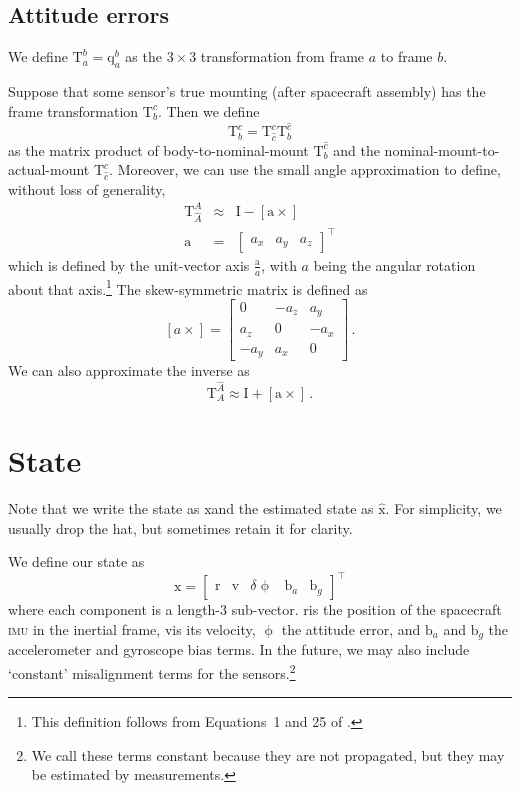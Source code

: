 \documentclass[12pt]{article}
\newcommand{\Tf}[2]{\ensuremath{\mathrm{T}_{#1}^{#2}}}
\newcommand{\skewsymm}[1]{\ensuremath{\left[ #1 \times \right]}}
\newcommand{\eye}{\ensuremath{\mathrm{I}}}
\newcommand{\Qf}[2]{\ensuremath{\mathrm{q}_{#1}^{#2}}}
\newcommand{\vecx}{\ensuremath{\mathrm{x}}}
\newcommand{\vecxh}{\ensuremath{\hat{\mathrm{x}}}}
\newcommand{\vecb}{\ensuremath{\mathrm{b}}}
\newcommand{\vecr}{\ensuremath{\mathrm{r}}}
\newcommand{\vecv}{\ensuremath{\mathrm{v}}}
\begin{document}
\subsection{Attitude errors}
We define $\Tf{a}{b} = \Qf{a}{b}$ as the $3\times 3$ transformation from frame $a$ to frame $b$.

Suppose that some sensor's true mounting (after spacecraft assembly) has the frame transformation \Tf{b}{c}. Then we define
\begin{equation}
\Tf{b}{c} = \Tf{\hat{c}}{c} \Tf{b}{\hat{c}}
\end{equation}
as the matrix product of body-to-nominal-mount \Tf{b}{\hat{c}} and the nominal-mount-to-actual-mount \Tf{\hat{c}}{c}. Moreover, we can use the small angle approximation to define, without loss of generality,
\begin{eqnarray}
\Tf{\hat{A}}{A} &\approx& \eye - \skewsymm{\mathrm{a}} \\
\mathrm{a} &=& \begin{bmatrix} a_x & a_y & a_z\end{bmatrix}^\top
\end{eqnarray}
which is defined by the unit-vector axis $\frac{\mathrm{a}}{a}$, with $a$ being the angular rotation about that axis.\footnote{This definition follows from Equations~1 and 25 of \citet{Markley2003}.} The skew-symmetric matrix is defined as
\begin{equation}
\skewsymm{a} = \begin{bmatrix}%
0 & -a_z & a_y \\
a_z & 0 & -a_x \\
-a_y & a_x & 0%
\end{bmatrix}\,\text{.}
\end{equation}
We can also approximate the inverse as
\begin{equation}
\Tf{A}{\hat{A}} \approx \eye + \skewsymm{\mathrm{a}}\,\text{.}
\end{equation}

\section{State}
Note that we write the state as \vecx and the estimated state as \vecxh. For simplicity, we usually drop the hat, but sometimes retain it for clarity.

We define our state as
\begin{equation}
\vecx = \begin{bmatrix} \vecr & \vecv & \delta\upphi & \vecb_a & \vecb_g \end{bmatrix}^\top
\end{equation}
where each component is a length-3 sub-vector. \vecr is the position of the spacecraft \textsc{imu} in the inertial frame, \vecv is its velocity, $\upphi$ the attitude error, and $\vecb_a$ and $\vecb_g$ the accelerometer and gyroscope bias terms. In the future, we may also include `constant' misalignment terms for the sensors.\footnote{We call these terms constant because they are not propagated, but they may be estimated by measurements.}
\end{document}
